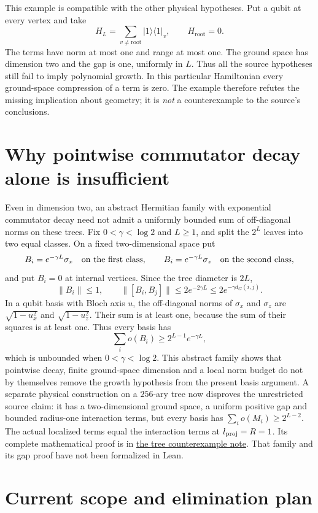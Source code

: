 \documentclass{article}
\begin{document}
This example is compatible with the other physical hypotheses. Put a qubit
at every vertex and take
\[
 H_L=\sum_{v\ne\mathrm{root}}|1\rangle\langle1|_v,
 \qquad H_{\mathrm{root}}=0.
\]
The terms have norm at most one and range at most one. The ground space has
dimension two and the gap is one, uniformly in $L$. Thus all the source
hypotheses still fail to imply polynomial growth. In this particular
Hamiltonian every ground-space compression of a term is zero. The example
therefore refutes the missing implication about geometry; it is \emph{not}
a counterexample to the source's conclusions.

\section{Why pointwise commutator decay alone is insufficient}

Even in dimension two, an abstract Hermitian family with exponential
commutator decay need not admit a uniformly bounded sum of off-diagonal
norms on these trees. Fix $0<\gamma<\log2$ and $L\ge1$, and split the
$2^L$ leaves into two equal classes. On a
fixed two-dimensional space put
\[
 B_i=e^{-\gamma L}\sigma_x\quad\hbox{on the first class},\qquad
 B_i=e^{-\gamma L}\sigma_z\quad\hbox{on the second class},
\]
and put $B_i=0$ at internal vertices. Since the tree diameter is $2L$,
\[
 \|B_i\|\le1,\qquad
 \|[B_i,B_j]\|\le2e^{-2\gamma L}
       \le2e^{-\gamma d_G(i,j)}.
\]
In a qubit basis with Bloch axis $u$, the off-diagonal norms of $\sigma_x$
and $\sigma_z$ are $\sqrt{1-u_x^2}$ and $\sqrt{1-u_z^2}$.
Their sum is at least one, because the sum of their squares is at least
one. Thus every basis has
\[
 \sum_i o(B_i)\ge2^{L-1}e^{-\gamma L},
\]
which is unbounded when $0<\gamma<\log2$.
This abstract family shows that
pointwise decay, finite ground-space dimension and a local norm budget do
not by themselves remove the growth hypothesis from the present basis
argument. A separate physical construction on a $256$-ary tree now
disproves the unrestricted source claim: it has a two-dimensional ground
space, a uniform positive gap and bounded radius-one interaction terms,
but every basis has $\sum_i o(M_i)\ge2^{L-2}$. The actual localized terms
equal the interaction terms at $l_{\rm proj}=R=1$. Its complete mathematical
proof is in
\href{https://sirui-lu.com/TNLean/paper-gaps/hastings05_tree_basis_counterexample.pdf}
{the tree counterexample note}. That family and its gap proof have not
been formalized in Lean.

\section{Current scope and elimination plan}
\end{document}
